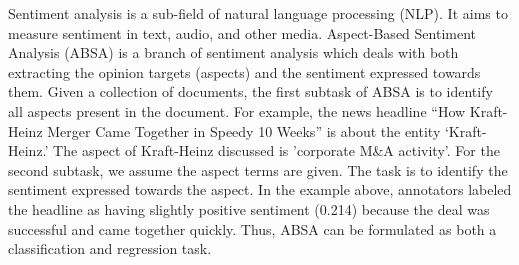 























Sentiment analysis is a sub-field of natural language processing (NLP). It aims to measure sentiment in text, audio, and other media. Aspect-Based Sentiment Analysis (ABSA) is a branch of sentiment analysis which deals with both extracting the opinion targets (aspects) and the sentiment expressed towards them. Given a collection of documents, the first subtask of ABSA is to identify all aspects present in the document. For example, the news headline “How Kraft-Heinz Merger Came Together in Speedy 10 Weeks” is about the entity ‘Kraft-Heinz.’ The aspect of Kraft-Heinz discussed is 'corporate M\&A activity'. For the second subtask, we assume the aspect terms are given. The task is to identify the sentiment expressed towards the aspect. In the example above, annotators labeled the headline as having slightly positive sentiment (0.214) because the deal was successful and came together quickly. Thus, ABSA can be formulated as both a classification and regression task.


